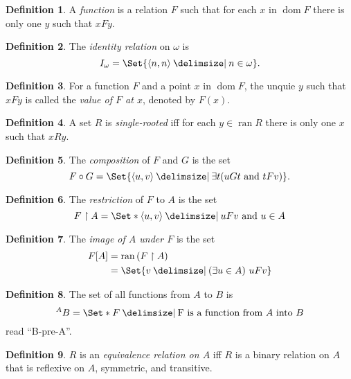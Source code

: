\documentclass[12pt]{article}
\theoremstyle{plain}
\theoremstyle{remark}
\theoremstyle{definition}
\newtheorem{defn}{Definition}[section]
\theoremstyle{remark}
\providecommand\st{}
\newcommand\SetSymbol[1][]{%
  \nonscript\:#1\vert%
  \allowbreak%
  \nonscript\:
\mathopen{}}
\DeclarePairedDelimiter{\ang}{\langle}{\rangle}
\renewcommand\st{\SetSymbol[\delimsize]}
\DeclareMathOperator{\dom}{dom}
\DeclareMathOperator{\ran}{ran}
\begin{document}
\begin{defn}
  A \textit{function} is a relation $F$ such that for each $x$ in $\dom F$ there is only one $y$ such that $xFy$.
\end{defn}

\begin{defn}
  The \textit{identity relation} on $\omega$ is
  \[
  I_\omega = \Set{\ang{n,n} \st n \in \omega}.
  \]
\end{defn}

\begin{defn}
  For a function $F$ and a point $x$ in $\dom F$, the unquie $y$ such that $xFy$ is called the \textit{value of $F$ at $x$}, denoted by $F(x)$.
\end{defn}

\begin{defn}
  A set $R$ is \textit{single-rooted} iff for each $y \in \ran R$ there is only one $x$ such that $xRy$.
\end{defn}

\begin{defn}
  The \textit{composition} of $F$ and $G$ is the set
  \[
    F \circ G = \Set{\ang{u, v} \st \exists t (uGt \text{ and } tFv)}.
  \]
\end{defn}

\begin{defn}
  The \textit{restriction} of $F$ to $A$ is the set
  \[
    F \restriction A = \Set*{\ang{u,v} \st uFv \text{ and } u \in A}
  \]
\end{defn}

\begin{defn}
  The \textit{image of $A$ under $F$} is the set
  \begin{align*}
    F [A] &= \ran{(F \restriction A)}\\
          &= \Set{v \st (\exists u \in A)\ uFv}
  \end{align*}
\end{defn}

\begin{defn}
  The set of all functions from $A$ to $B$ is
  \[
    ^A B = \Set*{F \st \text{F is a function from $A$ into $B$}}
  \]
  read ``B-pre-A''.
\end{defn}

\begin{defn}
  $R$ is an \textit{equivalence relation on $A$} iff $R$ is a binary relation on $A$ that is reflexive on $A$, symmetric, and transitive.
\end{defn}
\end{document}
